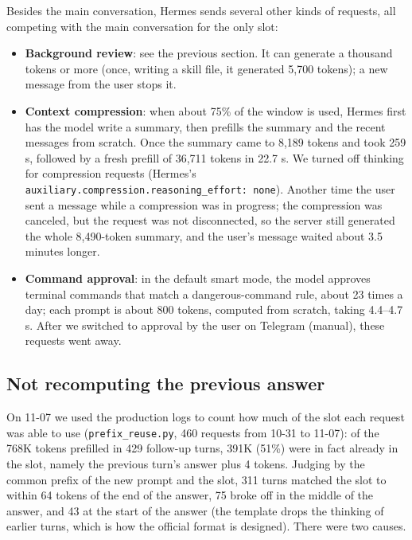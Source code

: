 \documentclass[11pt,a4paper]{article}
\newcommand{\code}[1]{\texttt{#1}}
\begin{document}
Besides the main conversation, Hermes sends several other kinds of requests, all competing with the main conversation for the only slot:
\begin{itemize}
  \item \textbf{Background review}: see the previous section. It can generate a thousand tokens or more (once, writing a skill file, it generated 5,700 tokens); a new message from the user stops it.
  \item \textbf{Context compression}: when about 75\% of the window is used, Hermes first has the model write a summary, then prefills the summary and the recent messages from scratch. Once the summary came to 8,189 tokens and took 259 s, followed by a fresh prefill of 36,711 tokens in 22.7 s. We turned off thinking for compression requests (Hermes's \code{auxiliary.compression.reasoning\_effort: none}). Another time the user sent a message while a compression was in progress; the compression was canceled, but the request was not disconnected, so the server still generated the whole 8,490-token summary, and the user's message waited about 3.5 minutes longer.
  \item \textbf{Command approval}: in the default smart mode, the model approves terminal commands that match a dangerous-command rule, about 23 times a day; each prompt is about 800 tokens, computed from scratch, taking 4.4--4.7 s. After we switched to approval by the user on Telegram (manual), these requests went away.
\end{itemize}

\subsection{Not recomputing the previous answer}
\label{sec:continue}

On 11-07 we used the production logs to count how much of the slot each request was able to use (\code{prefix\_reuse.py}, 460 requests from 10-31 to 11-07): of the 768K tokens prefilled in 429 follow-up turns, 391K (51\%) were in fact already in the slot, namely the previous turn's answer plus 4 tokens. Judging by the common prefix of the new prompt and the slot, 311 turns matched the slot to within 64 tokens of the end of the answer, 75 broke off in the middle of the answer, and 43 at the start of the answer (the template drops the thinking of earlier turns, which is how the official format is designed). There were two causes.
\end{document}
